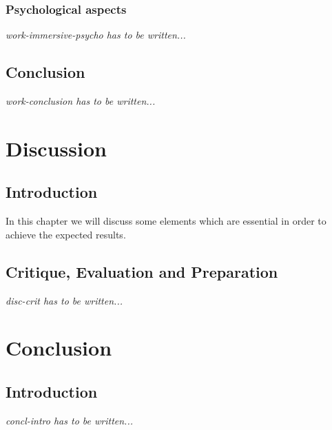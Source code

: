 \documentclass[letterpaper, openright]{report}
\begin{document}
            \subsection{Psychological aspects} %
			\label{subsub:work-immersive-psycho}
\textit{work-immersive-psycho has to be written...}
    
    \section{Conclusion} %
	\label{sub:work-conclusion}
\textit{work-conclusion has to be written...}

	\vspace{0.5cm}    

	\newpage
    
\chapter{Discussion} %
\label{sec:discussion}

	\section{Introduction} %
	\label{sub:disc-intro}
In this chapter we will discuss some elements which are essential in order to achieve the expected results. 
    
    \section{Critique, Evaluation and Preparation} %
	\label{sub:disc-crit}
\textit{disc-crit has to be written...}

	\newpage
    
\chapter{Conclusion} %
\label{sec:conclusion}

	\section{Introduction} %
	\label{sub:concl-intro}
\textit{concl-intro has to be written...}
    
\end{document}
